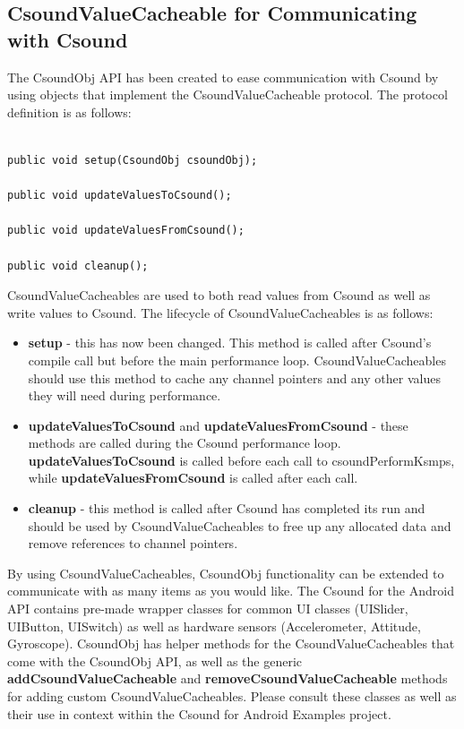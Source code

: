 \documentclass[11pt]{article}
\begin{document}
 

\subsection{CsoundValueCacheable for Communicating with Csound}

The CsoundObj API has been created to ease communication with Csound by using objects that implement the CsoundValueCacheable protocol.  The protocol definition is as follows:

\begin{lstlisting}[caption=CsoundValueCacheable Protocol Definition]

public void setup(CsoundObj csoundObj);
	
public void updateValuesToCsound();
	
public void updateValuesFromCsound();
	
public void cleanup();

\end{lstlisting}

CsoundValueCacheables are used to both read values from Csound as well as write values to Csound.  The lifecycle of CsoundValueCacheables is as follows:

\begin{itemize}
\item \textbf{setup} - this has now been changed. This method is called after Csound's compile call but before the main performance loop. CsoundValueCacheables should use this method to cache any channel pointers and any other values they will need during performance.
\item \textbf{updateValuesToCsound} and \textbf{updateValuesFromCsound} - these methods are called during the Csound performance loop. \textbf{updateValuesToCsound} is called before each call to csoundPerformKsmps, while \textbf{updateValuesFromCsound} is called after each call. 
\item \textbf{cleanup} - this method is called after Csound has completed its run and should be used by CsoundValueCacheables to free up any allocated data and remove references to channel pointers.
\end{itemize}

By using CsoundValueCacheables, CsoundObj functionality can be extended to communicate with as many items as you would like. The Csound for the Android API contains pre-made wrapper classes for common UI classes (UISlider, UIButton, UISwitch) as well as hardware sensors (Accelerometer, Attitude, Gyroscope).  CsoundObj has helper methods for the CsoundValueCacheables that come with the CsoundObj API, as well as the generic \textbf{addCsoundValueCacheable} and \textbf{removeCsoundValueCacheable} methods for adding custom CsoundValueCacheables. Please consult these classes as well as their use in context within the Csound for Android Examples project.
\end{document}
